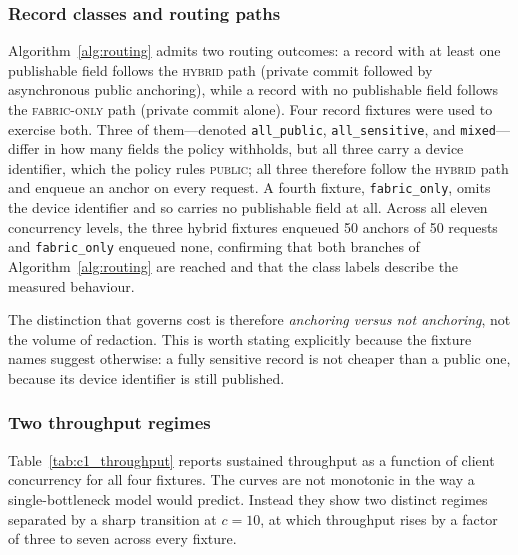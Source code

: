 \documentclass[final,5p,times,twocolumn]{elsarticle}
\begin{document}
\subsubsection*{\textbf{Record classes and routing paths}}
Algorithm~\ref{alg:routing} admits two routing outcomes: a record with at least
one publishable field follows the \textsc{hybrid} path (private commit followed
by asynchronous public anchoring), while a record with no publishable field
follows the \textsc{fabric-only} path (private commit alone). Four record
fixtures were used to exercise both. Three of them---denoted
\texttt{all\_public}, \texttt{all\_sensitive}, and \texttt{mixed}---differ in how
many fields the policy withholds, but all three carry a device identifier, which
the policy rules \textsc{public}; all three therefore follow the
\textsc{hybrid} path and enqueue an anchor on every request. A fourth fixture,
\texttt{fabric\_only}, omits the device identifier and so carries no publishable
field at all. Across all eleven concurrency levels, the three hybrid fixtures
enqueued 50 anchors of 50 requests and \texttt{fabric\_only} enqueued none,
confirming that both branches of Algorithm~\ref{alg:routing} are reached and
that the class labels describe the measured behaviour.


The distinction that governs cost is therefore \emph{anchoring versus not
anchoring}, not the volume of redaction. This is worth stating explicitly
because the fixture names suggest otherwise: a fully sensitive record is not
cheaper than a public one, because its device identifier is still published.

\subsubsection*{\textbf{Two throughput regimes}}
Table~\ref{tab:c1_throughput} reports sustained throughput as a function of
client concurrency for all four fixtures. The curves are not monotonic in the
way a single-bottleneck model would predict. Instead they show two distinct
regimes separated by a sharp transition at $c=10$, at which throughput rises by
a factor of three to seven across every fixture.
\end{document}
